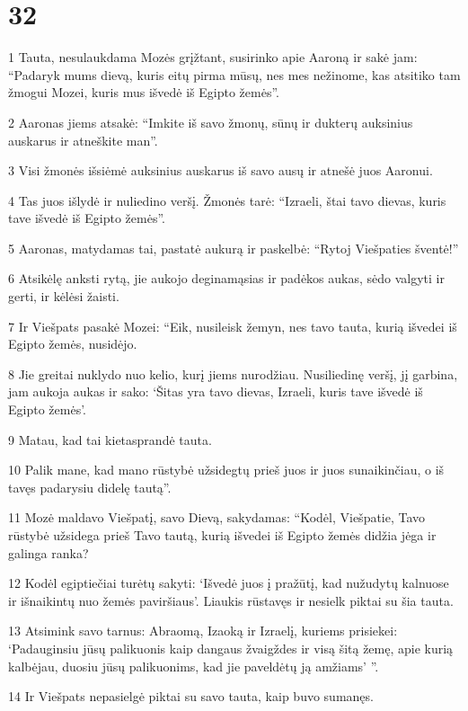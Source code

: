 \chapter{32}


\par 1 Tauta, nesulaukdama Mozės grįžtant, susirinko apie Aaroną ir sakė jam: “Padaryk mums dievą, kuris eitų pirma mūsų, nes mes nežinome, kas atsitiko tam žmogui Mozei, kuris mus išvedė iš Egipto žemės”. 
\par 2 Aaronas jiems atsakė: “Imkite iš savo žmonų, sūnų ir dukterų auksinius auskarus ir atneškite man”. 
\par 3 Visi žmonės išsiėmė auksinius auskarus iš savo ausų ir atnešė juos Aaronui. 
\par 4 Tas juos išlydė ir nuliedino veršį. Žmonės tarė: “Izraeli, štai tavo dievas, kuris tave išvedė iš Egipto žemės”. 
\par 5 Aaronas, matydamas tai, pastatė aukurą ir paskelbė: “Rytoj Viešpaties šventė!” 
\par 6 Atsikėlę anksti rytą, jie aukojo deginamąsias ir padėkos aukas, sėdo valgyti ir gerti, ir kėlėsi žaisti. 
\par 7 Ir Viešpats pasakė Mozei: “Eik, nusileisk žemyn, nes tavo tauta, kurią išvedei iš Egipto žemės, nusidėjo. 
\par 8 Jie greitai nuklydo nuo kelio, kurį jiems nurodžiau. Nusiliedinę veršį, jį garbina, jam aukoja aukas ir sako: ‘Šitas yra tavo dievas, Izraeli, kuris tave išvedė iš Egipto žemės’. 
\par 9 Matau, kad tai kietasprandė tauta. 
\par 10 Palik mane, kad mano rūstybė užsidegtų prieš juos ir juos sunaikinčiau, o iš tavęs padarysiu didelę tautą”. 
\par 11 Mozė maldavo Viešpatį, savo Dievą, sakydamas: “Kodėl, Viešpatie, Tavo rūstybė užsidega prieš Tavo tautą, kurią išvedei iš Egipto žemės didžia jėga ir galinga ranka? 
\par 12 Kodėl egiptiečiai turėtų sakyti: ‘Išvedė juos į pražūtį, kad nužudytų kalnuose ir išnaikintų nuo žemės paviršiaus’. Liaukis rūstavęs ir nesielk piktai su šia tauta. 
\par 13 Atsimink savo tarnus: Abraomą, Izaoką ir Izraelį, kuriems prisiekei: ‘Padauginsiu jūsų palikuonis kaip dangaus žvaigždes ir visą šitą žemę, apie kurią kalbėjau, duosiu jūsų palikuonims, kad jie paveldėtų ją amžiams’ ”. 
\par 14 Ir Viešpats nepasielgė piktai su savo tauta, kaip buvo sumanęs. 
